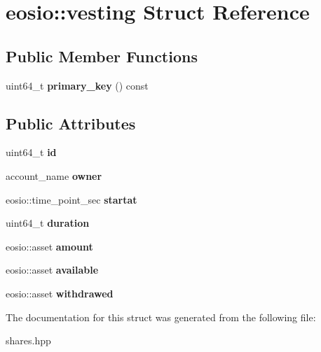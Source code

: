 \hypertarget{structeosio_1_1vesting}{}\section{eosio\+:\+:vesting Struct Reference}
\label{structeosio_1_1vesting}
\subsection*{Public Member Functions}
\begin{DoxyCompactItemize}
\item 
\mbox{\label{structeosio_1_1vesting_a3c093ab61055f1a0c3a667ba9c2855ab}} 
uint64\+\_\+t {\bfseries primary\+\_\+key} () const
\end{DoxyCompactItemize}
\subsection*{Public Attributes}
\begin{DoxyCompactItemize}
\item 
\mbox{\label{structeosio_1_1vesting_ae98570990c942ebdcb171d344a8db7f8}} 
uint64\+\_\+t {\bfseries id}
\item 
\mbox{\label{structeosio_1_1vesting_ae8b54fe4dc52efe7739788ec0cfd1346}} 
account\+\_\+name {\bfseries owner}
\item 
\mbox{\label{structeosio_1_1vesting_ab3907ffc6e5e062cb6a1496b6db0679b}} 
eosio\+::time\+\_\+point\+\_\+sec {\bfseries startat}
\item 
\mbox{\label{structeosio_1_1vesting_a6c24c93faf099c7378a3985b9ea0eb2c}} 
uint64\+\_\+t {\bfseries duration}
\item 
\mbox{\label{structeosio_1_1vesting_ae3667ebbeb0a29faceb2e2833271d5ec}} 
eosio\+::asset {\bfseries amount}
\item 
\mbox{\label{structeosio_1_1vesting_a589b29d72d033f44a6b18181613fc618}} 
eosio\+::asset {\bfseries available}
\item 
\mbox{\label{structeosio_1_1vesting_a2ddc10868b15ef3a150d4d19591fe232}} 
eosio\+::asset {\bfseries withdrawed}
\end{DoxyCompactItemize}


The documentation for this struct was generated from the following file\+:\begin{DoxyCompactItemize}
\item 
shares.\+hpp\end{DoxyCompactItemize}
